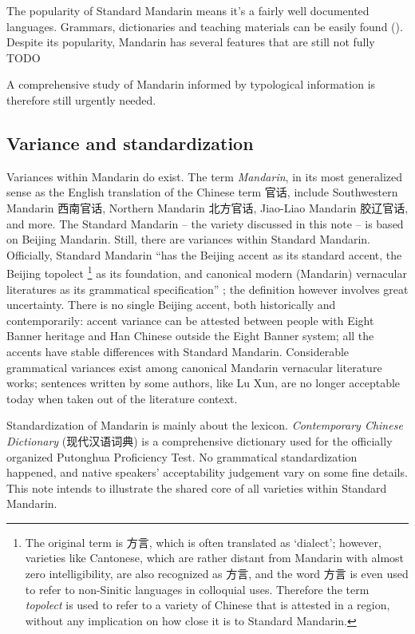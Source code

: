 \documentclass[UTF8, a4paper, oneside, scheme=plain, 12pt]{ctexrep}
\newcommand*{\citepage}[1]{p.~{#1}}
\newcommand*{\term}[1]{\emph{#1}}
\newcommand{\work}[1]{\textit{#1}}
\newcommand{\translate}[1]{`#1'}
\begin{document}
The popularity of Standard Mandarin means it's a fairly well documented languages.
Grammars, dictionaries and teaching materials can be easily found 
().
Despite its popularity, Mandarin has several features that 
are still not fully TODO

A comprehensive study of Mandarin informed by typological information 
is therefore still urgently needed. 

\subsection{Variance and standardization}

Variances within Mandarin do exist. 
The term \term{Mandarin}, in its most generalized sense as the English translation 
of the Chinese term 官话, 
include Southwestern Mandarin 西南官话, 
Northern Mandarin 北方官话,
Jiao-Liao Mandarin 胶辽官话, 
and more.
The Standard Mandarin -- the variety discussed in this note -- 
is based on Beijing Mandarin. 
Still, there are variances within Standard Mandarin.
Officially, Standard Mandarin 
``has the Beijing accent as its standard accent, 
the Beijing topolect%
\footnote{
    The original term is 方言, 
    which is often translated as \translate{dialect};
    however, varieties like Cantonese, 
    which are rather distant from Mandarin
    with almost zero intelligibility, 
    are also recognized as 方言, 
    and the word 方言 is even used to refer to 
    non-Sinitic languages in colloquial uses.
    Therefore the term \term{topolect} is used 
    to refer to a variety of Chinese that is attested in a region,
    without any implication on how close it is to Standard Mandarin.
} as its foundation,
and canonical modern (Mandarin) vernacular literatures 
as its grammatical specification''
\citep[\citepage{18}]{deng2010formal};
the definition however involves great uncertainty.
There is no single Beijing accent, both historically and contemporarily: 
accent variance can be attested 
between people with Eight Banner heritage and 
Han Chinese outside the Eight Banner system;
all the accents have stable differences with Standard Mandarin.
Considerable grammatical variances exist among 
canonical Mandarin vernacular literature works;
sentences written by some authors, like Lu Xun,
are no longer acceptable today when taken out of 
the literature context. 

Standardization of Mandarin is mainly about the lexicon.
\work{Contemporary Chinese Dictionary} (现代汉语词典)
is a comprehensive dictionary used for the officially organized 
Putonghua Proficiency Test.
No grammatical standardization happened,
and native speakers' acceptability judgement vary 
on some fine details.
This note intends to illustrate the shared core 
of all varieties within Standard Mandarin.
\end{document}
